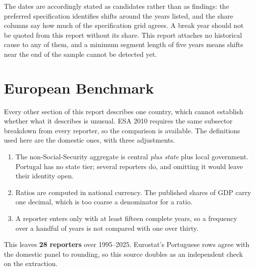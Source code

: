 \documentclass[11pt,a4paper]{article}
\begin{document}
The dates are accordingly stated as candidates rather than as findings: the preferred
specification identifies shifts around the years listed, and the share columns say how much
of the specification grid agrees. A break year should not be quoted from this report without
its share. This report attaches no historical cause to any of them, and a minimum segment
length of five years means shifts near the end of the sample cannot be detected yet.

\section{European Benchmark}
\label{sec:benchmark}

Every other section of this report describes one country, which cannot establish whether
what it describes is unusual. ESA 2010 requires the same subsector breakdown from every
reporter, so the comparison is available. The definitions used here are the domestic ones,
with three adjustments.

\begin{enumerate}
\item The non-Social-Security aggregate is central \emph{plus state} plus local
government. Portugal has no state tier; several reporters do, and omitting it would leave
their identity open.
\item Ratios are computed in national currency. The published shares of GDP carry one
decimal, which is too coarse a denominator for a ratio.
\item A reporter enters only with at least fifteen complete years, so a frequency over a
handful of years is not compared with one over thirty.
\end{enumerate}

This leaves \textbf{28 reporters} over
1995--2025. Eurostat's
Portuguese rows agree with the domestic panel to rounding, so this source doubles as an
independent check on the extraction.
\end{document}
